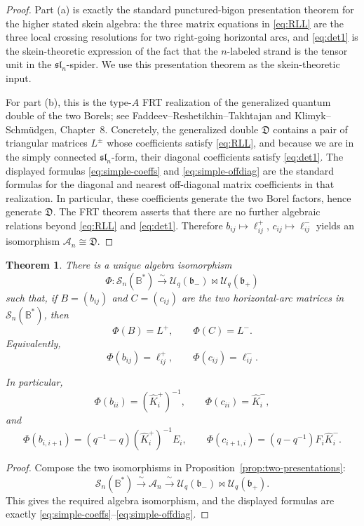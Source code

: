 \documentclass[11pt]{article}
\newtheorem{theorem}{Theorem}
\newcommand{\Uc}{\mathcal U}
\newcommand{\bcS}{\mathcal S}
\newcommand{\fb}{\mathfrak b}
\newcommand{\fB}{\mathbb B}
\newcommand{\bipr}{\mathbin{\bowtie}}
\begin{document}
\begin{proof}
Part (a) is exactly the standard punctured-bigon presentation theorem for the higher stated skein algebra:
the three matrix equations in \eqref{eq:RLL} are the three local crossing resolutions for two right-going horizontal arcs, and \eqref{eq:det1} is the skein-theoretic expression of the fact that the \(n\)-labeled strand is the tensor unit in the \(\mathfrak{sl}_n\)-spider.  We use this presentation theorem as the skein-theoretic input.

For part (b), this is the type-\(A\) FRT realization of the generalized quantum double of the two Borels; see Faddeev--Reshetikhin--Takhtajan and Klimyk--Schm\"udgen, Chapter~8.  Concretely, the generalized double \(\mathfrak D\) contains a pair of triangular matrices \(L^\pm\) whose coefficients satisfy \eqref{eq:RLL}, and because we are in the simply connected \(\mathfrak{sl}_n\)-form, their diagonal coefficients satisfy \eqref{eq:det1}.  The displayed formulas \eqref{eq:simple-coeffs} and \eqref{eq:simple-offdiag} are the standard formulas for the diagonal and nearest off-diagonal matrix coefficients in that realization.  In particular, these coefficients generate the two Borel factors, hence generate \(\mathfrak D\).  The FRT theorem asserts that there are no further algebraic relations beyond \eqref{eq:RLL} and \eqref{eq:det1}.  Therefore \(b_{ij}\mapsto \ell^+_{ij}\), \(c_{ij}\mapsto \ell^-_{ij}\) yields an isomorphism \(\mathcal A_n\cong \mathfrak D\).
\end{proof}

\begin{theorem}\label{thm:main}
There is a unique algebra isomorphism
\[
\Phi:\bcS_n(\fB^\ast)\xrightarrow{\sim}\Uc_q(\fb_-)\bipr \Uc_q(\fb_+)
\]
such that, if \(B=(b_{ij})\) and \(C=(c_{ij})\) are the two horizontal-arc matrices in \(\bcS_n(\fB^\ast)\), then
\[
\Phi(B)=L^+,\qquad \Phi(C)=L^-.
\]
Equivalently,
\[
\Phi(b_{ij})=\ell^+_{ij},\qquad \Phi(c_{ij})=\ell^-_{ij}.
\]

In particular,
\[
\Phi(b_{ii})=(\hat K_i^+)^{-1},\qquad
\Phi(c_{ii})=\hat K_i^-,
\]
and
\[
\Phi(b_{i,i+1})=(q^{-1}-q)(\hat K_i^+)^{-1}E_i,\qquad
\Phi(c_{i+1,i})=(q-q^{-1})F_i\hat K_i^-.
\]
\end{theorem}

\begin{proof}
Compose the two isomorphisms in Proposition~\ref{prop:two-presentations}:
\[
\bcS_n(\fB^\ast)\xrightarrow{\ \sim\ }\mathcal A_n\xrightarrow{\ \sim\ }\Uc_q(\fb_-)\bipr \Uc_q(\fb_+).
\]
This gives the required algebra isomorphism, and the displayed formulas are exactly
\eqref{eq:simple-coeffs}--\eqref{eq:simple-offdiag}.
\end{proof}
\end{document}
